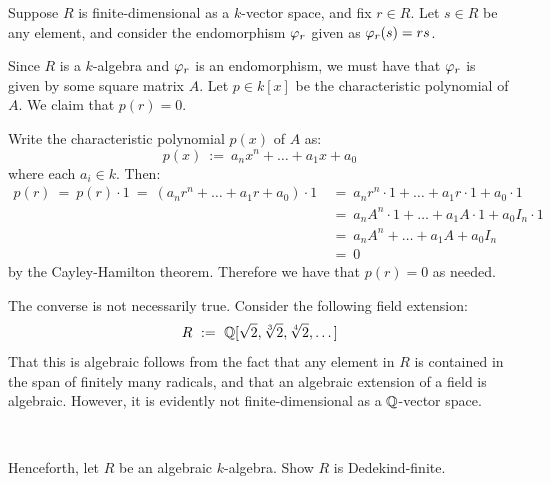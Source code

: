 \begin{pf}
	Suppose $R$ is finite-dimensional as a $k$-vector space, and fix $r\in R$.
	Let $s \in R$ be any element, and consider the endomorphism $\varphi_{r}$
	given as $\varphi_{r}(s)=rs$.

	Since $R$ is a $k$-algebra and $\varphi_{r}$ is an endomorphism, we must
	have that $\varphi_{r}$ is given by some square matrix $A$.
	Let $p\in k[x]$ be the characteristic polynomial of $A$.
	We claim that $p(r)=0$.

	Write the characteristic polynomial $p(x)$ of $A$ as:
	\begin{equation*}
		p(x) \ := \ a_{n}x^{n}+ \dots + a_{1}x + a_{0}
	\end{equation*}
	where each $a_{i}\in k$. Then:
	\begin{align*}
	    p(r) \ = \ p(r)\cdot1 \ = \ (a_{n}r^{n}+\dots+a_{1}r+a_{0})\cdot1
		& \ = \ a_{n}r^{n}\cdot1+\dots+a_{1}r\cdot1+a_{0}\cdot1 \\
		& \ = \ a_{n}A^{n}\cdot1+\dots+a_{1}A\cdot1+a_{0}I_{n}\cdot1 \\
		& \ = \ a_{n}A^{n}+\dots+a_{1}A+a_{0}I_{n} \\
		& \ = \ 0
	\end{align*}
	by the Cayley-Hamilton theorem.
	Therefore we have that $p(r)=0$ as needed.

	The converse is not necessarily true.
	Consider the following field extension:
	\begin{equation*}
		R \ := \ \bQ[\sqrt{2},\sqrt[3]{2},\sqrt[4]{2},\dots]
	\end{equation*}
	That this is algebraic follows from the fact that any element in $R$
	is contained in the span of finitely many radicals, and that an algebraic
	extension of a field is algebraic.
	However, it is evidently not finite-dimensional as a $\mathbb{Q}$-vector space.
\end{pf} \

\newpage
\begin{exr}[title=Exercise 1.13 part b)]
	Henceforth, let $R$ be an algebraic $k$-algebra.
	Show $R$ is Dedekind-finite.
\end{exr} \

